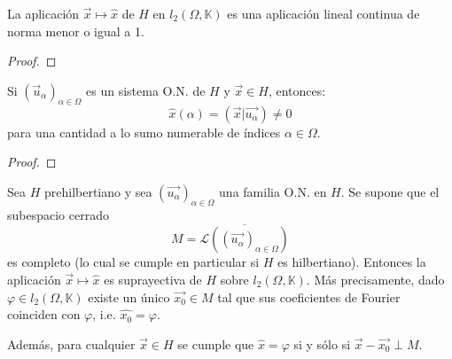 \documentclass[12pt]{report}
\theoremstyle{largebreak}
\newcommand\pint[2]{\ensuremath{\left(#1\big| #2\right)}}
\begin{document}
    \begin{cor}
        La aplicación $\vec{x}\mapsto\hat{x}$ de $H$ en $l_2(\Omega,\mathbb{K})$ es una aplicación lineal continua de norma menor o igual a 1.
    \end{cor}

    \begin{proof}
        
    \end{proof}
        
    \begin{cor}
        Si $(\vec{u}_\alpha)_{\alpha\in\Omega}$ es un sistema O.N. de $H$ y $\vec{x}\in H$, entonces:
        \begin{equation*}
            \hat{x}(\alpha)=\pint{\vec{x}}{\vec{u_\alpha}}\neq0
        \end{equation*}
        para una cantidad a lo sumo numerable de índices $\alpha\in\Omega$.
    \end{cor}

    \begin{proof}
        
    \end{proof}

    \begin{theor}
        Sea $H$ prehilbertiano y sea $(\vec{u_\alpha})_{\alpha\in\Omega}$ una familia O.N. en $H$. Se supone que el subespacio cerrado
        \begin{equation*}
            M=\overline{\mathcal{L}((\vec{u_\alpha})_{\alpha\in\Omega})}
        \end{equation*}
        es completo (lo cual se cumple en particular si $H$ es hilbertiano). Entonces la aplicación $\vec{x}\mapsto\hat{x}$ es suprayectiva de $H$ sobre $l_2(\Omega,\mathbb{K})$. Más precisamente, dado $\varphi\in l_2(\Omega,\mathbb{K})$ existe un único $\vec{x_0}\in M$ tal que sus coeficientes de Fourier coinciden con $\varphi$, i.e. $\hat{x_0}=\varphi$.
        
        Además, para cualquier $\vec{x}\in H$ se cumple que $\hat{x}=\varphi$ si y sólo si $\vec{x}-\vec{x_0}\perp M$. 
    \end{theor}
\end{document}
